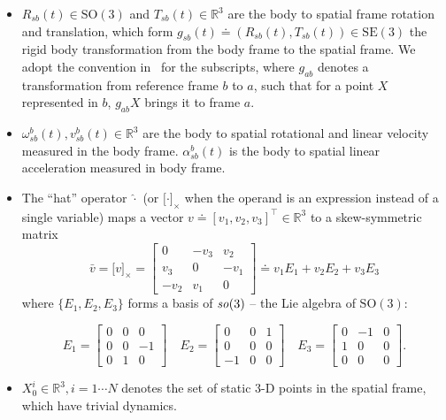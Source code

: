 \documentclass[letter,10pt]{article}
\newcommand{\SE}[1]{ \mathrm{SE(#1)} }
\newcommand{\SO}[1]{ \mathrm{SO(#1)} }
\newcommand{\real}{\mathbb{R}}
\newcommand{\asym}[1]{{\lbrack #1\rbrack}_\times{}}
\begin{document}
\begin{itemize}
 \item 
$R_{sb}(t) \in \SO{3}$ and $T_{sb}(t) \in \real^3$ are the body to spatial frame rotation and translation, which form $g_{sb}(t)\doteq (R_{sb}(t), T_{sb}(t)) \in \SE{3}$ the rigid body transformation from the body frame to the spatial frame. We adopt the convention in~\cite{maSKS} for the subscripts, where $g_{ab}$ denotes a transformation from reference frame $b$ to $a$, such that for a point $X$ represented in $b$, $g_{ab} X$ brings it to frame $a$.

\item
$\omega_{sb}^b(t), v_{sb}^b(t)\in \real^3$ are the body to spatial rotational and linear velocity measured in the body frame. $\alpha_{sb}^b(t)$ is the body to spatial linear acceleration measured in body frame. 

\item
The ``hat'' operator $\hat{\cdot}$ (or $\asym{\cdot}$ when the operand is an expression instead of a single variable) maps a vector $v \doteq [v_1, v_2, v_3]^\top \in \real^3$ to a skew-symmetric matrix 
$$
\bar{v}=
\asym{v}=
\begin{bmatrix}
    0 & -v_3 & v_2 \\
    v_3 & 0 & -v_1 \\
    -v_2 & v_1 & 0
\end{bmatrix}
\doteq v_1 E_1 + v_2 E_2 + v_3 E_3$$ 
where $\{E_1, E_2, E_3\}$ forms a basis of ${\it so}(3)$ -- the Lie algebra of $\SO{3}$:

\begin{equation}
E_1=
\begin{bmatrix}
0 & 0 & 0 \\
0 & 0 & -1 \\
0 & 1 & 0
\end{bmatrix}
\quad
E_2=
\begin{bmatrix}
0 & 0 & 1 \\
0 & 0 & 0 \\
-1 & 0 & 0
\end{bmatrix}
\quad
E_3=
\begin{bmatrix}
0 & -1 & 0 \\
1 & 0 & 0 \\
0 & 0 & 0
\end{bmatrix}.
\end{equation}


\item
$X_0^i \in \real^3, i=1\cdots N$ denotes the set of static 3-D points in the spatial frame, which have trivial dynamics.


\end{itemize}
\end{document}

